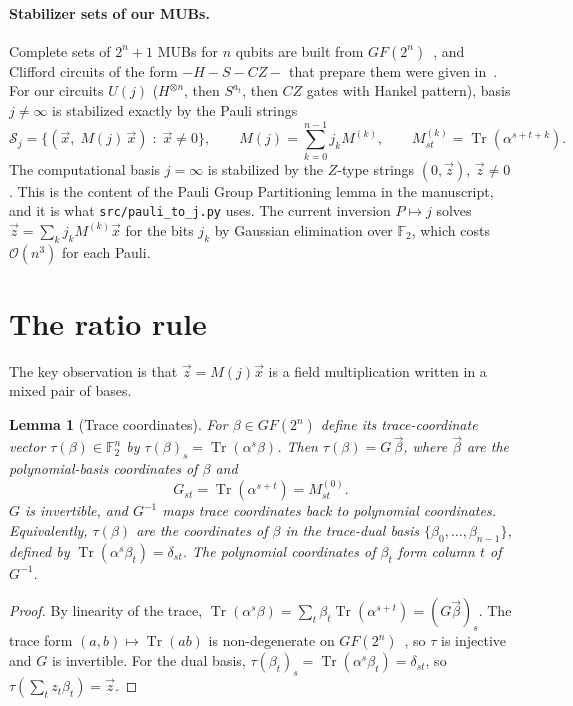 \documentclass[11pt]{article}
\newtheorem{lemma}{Lemma}
\theoremstyle{definition}
\theoremstyle{remark}
\newcommand{\F}{\mathbb{F}}
\newcommand{\Tr}{\operatorname{Tr}}
\newcommand{\vx}{\vec{x}}
\newcommand{\vz}{\vec{z}}
\begin{document}
\paragraph{Stabilizer sets of our MUBs.}
Complete sets of $2^n+1$ MUBs for $n$ qubits are built from $GF(2^n)$~\cite{Wootters1989,Bandyopadhyay2002,Lawrence2002,Klappenecker2004constructions,Durt2010}, and Clifford circuits of the form $-H-S-CZ-$ that prepare them were given in~\cite{Zhang2023ShadowMUB,WuWang2024}.
For our circuits $U(j)$ ($H^{\otimes n}$, then $S^{a_t}$, then $CZ$ gates with Hankel pattern), basis $j\neq\infty$ is stabilized exactly by the Pauli strings
\begin{equation}\label{eq:stab}
  \mathcal{S}_j=\bigl\{(\vx,\; M(j)\,\vx)\;:\;\vx\neq 0\bigr\},\qquad
  M(j)=\sum_{k=0}^{n-1} j_k M^{(k)},\qquad
  M^{(k)}_{st}=\Tr\!\left(\alpha^{s+t+k}\right).
\end{equation}
The computational basis $j=\infty$ is stabilized by the $Z$-type strings $(0,\vz)$, $\vz\neq0$.
This is the content of the Pauli Group Partitioning lemma in the manuscript, and it is what \texttt{src/pauli\_to\_j.py} uses.
The current inversion $P\mapsto j$ solves $\vz=\sum_k j_k M^{(k)}\vx$ for the bits $j_k$ by Gaussian elimination over $\F_2$, which costs $\mathcal{O}(n^3)$ for each Pauli.

\section{The ratio rule}

The key observation is that $\vz=M(j)\vx$ is a field multiplication written in a mixed pair of bases.

\begin{lemma}[Trace coordinates]\label{lem:trace}
For $\beta\in GF(2^n)$ define its trace-coordinate vector $\tau(\beta)\in\F_2^n$ by $\tau(\beta)_s=\Tr(\alpha^s\beta)$.
Then $\tau(\beta)=G\,\vec\beta$, where $\vec\beta$ are the polynomial-basis coordinates of $\beta$ and
\[
  G_{st}=\Tr\!\left(\alpha^{s+t}\right)=M^{(0)}_{st}.
\]
$G$ is invertible, and $G^{-1}$ maps trace coordinates back to polynomial coordinates.
Equivalently, $\tau(\beta)$ are the coordinates of $\beta$ in the \emph{trace-dual basis} $\{\beta_0,\dots,\beta_{n-1}\}$, defined by $\Tr(\alpha^s\beta_t)=\delta_{st}$.
The polynomial coordinates of $\beta_t$ form column $t$ of $G^{-1}$.
\end{lemma}

\begin{proof}
By linearity of the trace, $\Tr(\alpha^s\beta)=\sum_t \beta_t\Tr(\alpha^{s+t})=(G\vec\beta)_s$.
The trace form $(a,b)\mapsto\Tr(ab)$ is non-degenerate on $GF(2^n)$~\cite[Ch.~2]{lidl1997finite}, so $\tau$ is injective and $G$ is invertible.
For the dual basis, $\tau(\beta_t)_s=\Tr(\alpha^s\beta_t)=\delta_{st}$, so $\tau\!\left(\sum_t z_t\beta_t\right)=\vz$.
\end{proof}
\end{document}
